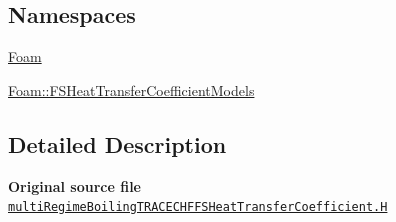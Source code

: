 \subsection*{Namespaces}
\begin{DoxyCompactItemize}
\item 
 \hyperlink{namespaceFoam}{Foam}
\item 
 \hyperlink{namespaceFoam_1_1FSHeatTransferCoefficientModels}{Foam\+::\+F\+S\+Heat\+Transfer\+Coefficient\+Models}
\end{DoxyCompactItemize}


\subsection{Detailed Description}
{\bfseries Original source file} \href{../../../home/carlo/data/GeN-Foam/GeN-Foam_ffn/GeN-Foam/GeN-Foam/classes/thermalHydraulics/src/physicsModels/heatTransferModels/FSHeatTransferCoefficientModels/multiRegimeBoilingTRACECHF/multiRegimeBoilingTRACECHFFSHeatTransferCoefficient.H}{\tt multi\+Regime\+Boiling\+T\+R\+A\+C\+E\+C\+H\+F\+F\+S\+Heat\+Transfer\+Coefficient.\+H} 